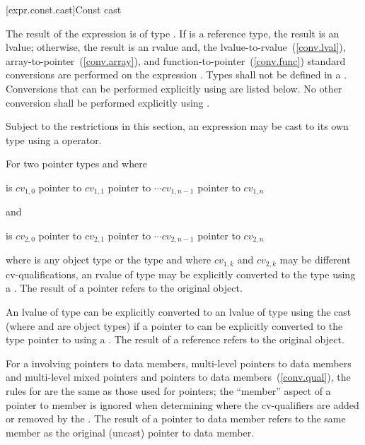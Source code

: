 [expr.const.cast]{Const cast}

\pnum
{}%
%
The result of the expression  is of type
. If  is a reference type, the result is an
lvalue; otherwise, the result is an rvalue and, the
lvalue-to-rvalue~(\ref{conv.lval}), array-to-pointer~(\ref{conv.array}),
and function-to-pointer~(\ref{conv.func}) standard conversions are
performed on the expression . Types shall not be defined in
a . Conversions that can be performed explicitly using
 are listed below. No other conversion shall be
performed explicitly using .

\pnum
\enternote 
Subject to the restrictions in this section, an expression may be cast
to its own type using a  operator.
\exitnote 

\pnum
For two pointer types  and  where

\begin{indented}
 is $\mathit{cv}_{1,0}$ pointer to $\mathit{cv}_{1,1}$ pointer
to $\cdots \mathit{cv}_{1,n-1}$ pointer to $\mathit{cv}_{1,n}$ 
\end{indented}

and

\begin{indented}
 is $\mathit{cv}_{2,0}$ pointer to $\mathit{cv}_{2,1}$ pointer
to $\cdots \mathit{cv}_{2,n-1}$ pointer to $\mathit{cv}_{2,n}$ 
\end{indented}

where
 is any object type or the  type and where
$\mathit{cv}_{1,k}$ and $\mathit{cv}_{2,k}$ may be different
cv-qualifications, an rvalue of type  may be explicitly
converted to the type  using a . The result
of a pointer  refers to the original object.

\pnum
An lvalue of type  can be explicitly converted to an lvalue
of type  using the cast  (where
 and  are object types) if a pointer to  can
be explicitly converted to the type pointer to  using a
. The result of a reference  refers
to the original object.

\pnum
For a  involving pointers to data members, multi-level
pointers to data members and multi-level mixed pointers and pointers to
data members~(\ref{conv.qual}), the rules for  are the
same as those used for pointers; the ``member'' aspect of a pointer to
member is ignored when determining where the cv-qualifiers are added or
removed by the . The result of a pointer to data
member  refers to the same member as the original
(uncast) pointer to data member.

